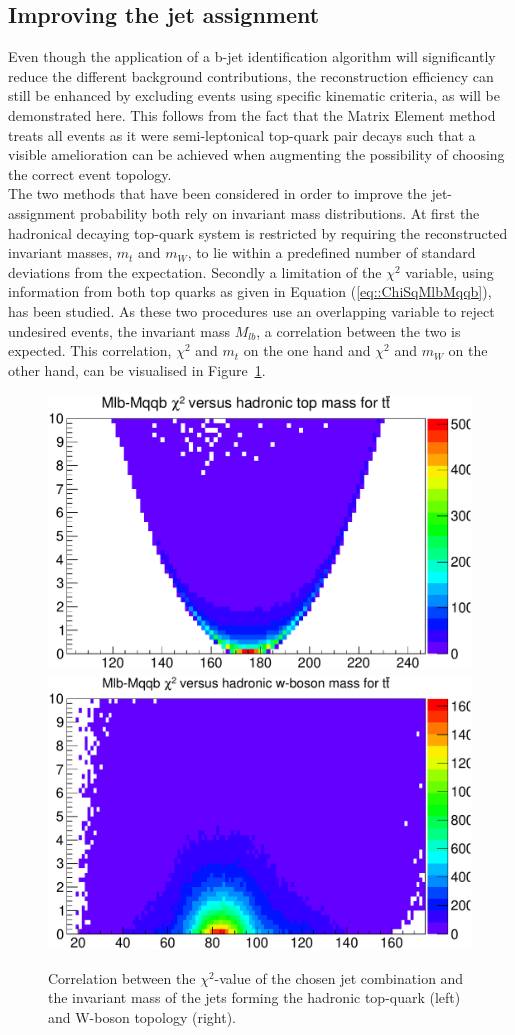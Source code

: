 \subsection{Improving the jet assignment}\label{subsec::MassCuts}
Even though the application of a b-jet identification algorithm will significantly reduce the different background contributions, the reconstruction efficiency can still be enhanced by excluding events using specific kinematic criteria, as will be demonstrated here.
This follows from the fact that the Matrix Element method treats all events as it were semi-leptonical top-quark pair decays such that a visible amelioration can be achieved when augmenting the possibility of choosing the correct event topology.
\\
The two methods that have been considered in order to improve the jet-assignment probability both rely on invariant mass distributions. %
At first the hadronical decaying top-quark system is restricted by requiring the reconstructed invariant masses, $m_t$ and $m_W$, to lie within a predefined number of standard deviations from the expectation. Secondly a limitation of the $\chi^{2}$ variable, using information from both top quarks as given in Equation (\ref{eq::ChiSqMlbMqqb}), has been studied.
As these two procedures use an overlapping variable to reject undesired events, the invariant mass $M_{lb}$, a correlation between the two is expected.
This correlation, $\chi^{2}$ and $m_{t}$ on the one hand and $\chi^{2}$ and $m_{W}$ on the other hand, can be visualised in Figure~\ref{fig::2Dexclusion}.

\begin{figure}[h!t]
 \centering
 \includegraphics[width = 0.45 \textwidth]{Chapters/Chapter4_EvtSel/Figures/MqqbVSChiSq.pdf} %
 \includegraphics[width = 0.45 \textwidth]{Chapters/Chapter4_EvtSel/Figures/MlbVSChiSq.pdf} %
 \caption{Correlation between the $\chi^{2}$-value of the chosen jet combination and the invariant mass of the jets forming the hadronic top-quark (left) and W-boson topology (right).} \label{fig::2Dexclusion}
\end{figure}

